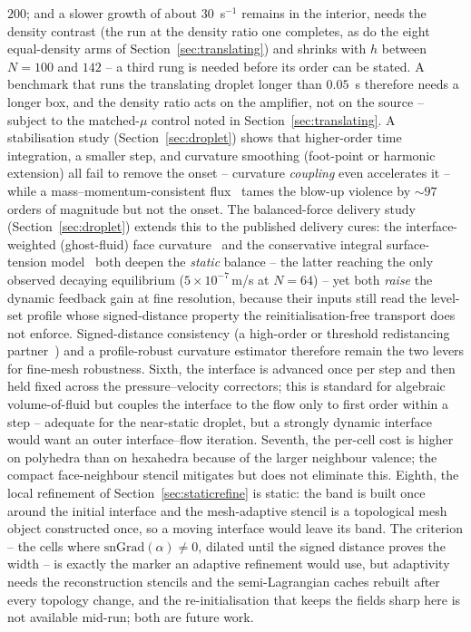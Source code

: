 \documentclass[preprint,3p,11pt]{elsarticle}
\begin{document}
$200$; and a slower growth of about $30$~s$^{-1}$ remains in the interior, needs the
density contrast (the run at the density ratio one completes, as do the eight equal-density
arms of Section~\ref{sec:translating}) and shrinks with $h$ between $N=100$ and $142$ -- a
third rung is needed before its order can be stated. A benchmark that runs the translating
droplet longer than $0.05$~s therefore needs a longer box, and the density ratio acts on
the amplifier, not on the source -- subject to the matched-$\mu$ control noted in
Section~\ref{sec:translating}. A stabilisation
study (Section~\ref{sec:droplet}) shows that higher-order time integration, a smaller step, and
curvature smoothing (foot-point or harmonic extension) all fail to remove the onset -- curvature
\emph{coupling} even accelerates it -- while a mass--momentum-consistent flux~\cite{rudman1998,vaudor2017}
tames the blow-up violence by $\sim\!97$ orders of magnitude but not the onset. The balanced-force
delivery study (Section~\ref{sec:droplet}) extends this to the published delivery cures: the
interface-weighted (ghost-fluid) face curvature~\cite{kang2000,abadie2015} and the conservative
integral surface-tension model~\cite{abualsaud2018} both deepen the \emph{static} balance -- the
latter reaching the only observed decaying equilibrium ($5\times10^{-7}$\,m/s at $N{=}64$) -- yet
both \emph{raise} the dynamic feedback gain at fine resolution, because their inputs still read the
level-set profile whose signed-distance property the reinitialisation-free transport does not
enforce. Signed-distance consistency (a high-order or threshold redistancing
partner~\cite{abualsaud2018}) and a profile-robust curvature estimator therefore remain the two
levers for fine-mesh robustness. Sixth, the
interface is advanced once per step and then held fixed across the pressure--velocity
correctors; this is standard for algebraic volume-of-fluid but couples the interface to the
flow only to first order within a step -- adequate for the near-static droplet, but a
strongly dynamic interface would want an outer interface--flow iteration. Seventh, the
per-cell cost is higher on polyhedra than on hexahedra because of the larger neighbour
valence; the compact face-neighbour stencil mitigates but does not eliminate this.
Eighth, the local refinement of Section~\ref{sec:staticrefine} is static: the band is
built once around the initial interface and the mesh-adaptive stencil is a topological
mesh object constructed once, so a moving interface would leave its band. The
criterion -- the cells where $\mathrm{snGrad}(\alpha)\neq0$, dilated until the signed
distance proves the width -- is exactly the marker an adaptive refinement would use,
but adaptivity needs the reconstruction stencils and the semi-Lagrangian caches
rebuilt after every topology change, and the re-initialisation that keeps the fields
sharp here is not available mid-run; both are future work.
\end{document}
